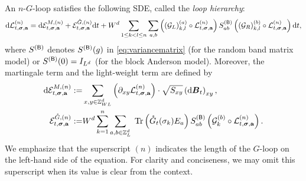  
\begin{lemma} \label{lem:SE_basic}
An $n$-$G$-loop satisfies the following SDE, called the \emph{loop hierarchy}:
\begin{align}\label{eq:mainStoflow}
\mathrm{d}\mathcal{L}^{(n)}_{t, {\boldsymbol{\sigma}}, {\mathbf{a}}} = \mathrm{d}\mathcal{E}^{M,(n)}_{t, {\boldsymbol{\sigma}}, \mathbf{a}} + \mathcal{E}^{{\mathring G},(n)}_{t, {\boldsymbol{\sigma}}, {\mathbf{a}}}\mathrm{d} t +
   W^{d} \sum_{1 \le k < l \le n} \sum_{a, b} \left( {(\mathcal{G}_L)}^{(a)}_{k, l} \circ \mathcal{L}^{(n)}_{t, {\boldsymbol{\sigma}}, {\mathbf{a}}} \right) S^{({\mathsf{B}})}_{ab} \left( {(\mathcal{G}_R)}^{(b)}_{k, l} \circ \mathcal{L}^{(n)}_{t, {\boldsymbol{\sigma}}, {\mathbf{a}}} \right) \mathrm{d} t, 
\end{align}
where $S^{({\mathsf{B}})}$ denotes $S^{({\mathsf{B}})}(g)$ in \eqref{eq:variancematrix} (for the random band matrix model) or $S^{({\mathsf{B}})}(0)=I_{L^d}$ (for the block Anderson model). Moreover, the martingale term  and the light-weight term %
 are defined by 
 \begin{align} \label{def_Edif}
\mathrm{d}\mathcal{E}^{M,(n)}_{t, {\boldsymbol{\sigma}}, {\mathbf{a}}} :  = & \sum_{x,y\in {\mathbb Z}_{WL}^d} 
  \left( \partial_{xy}  {\mathcal L}^{(n)}_{t, {\boldsymbol{\sigma}}, {\mathbf{a}}}  \right)
 \cdot \sqrt{S _{xy}}
  \left(\mathrm{d} \boldsymbol{B}_t\right)_{xy}, \\\label{def_EwtG}
\mathcal{E}^{{\mathring G},(n)}_{t, {\boldsymbol{\sigma}}, {\mathbf{a}}}:= &  {W}^d \sum_{k=1}^n \sum_{a, b\in {\mathbb Z}_L^d} \; 
 \operatorname{Tr}\left({ {\mathring G}_t(\sigma_k) E_{a} }\right)
   S^{({\mathsf{B}})}_{ab} 
  \left( {\mathcal{G}}^{(b)}_{k} \circ {\mathcal L}^{(n)}_{t, {\boldsymbol{\sigma}}, {\mathbf{a}}} \right) . 
\end{align}
We emphasize that the superscript $(n)$ indicates the length of the $G$-loop on the left-hand side of the equation. For clarity and conciseness, we may omit this superscript when its value is clear from the context. %
  \end{lemma}
  
